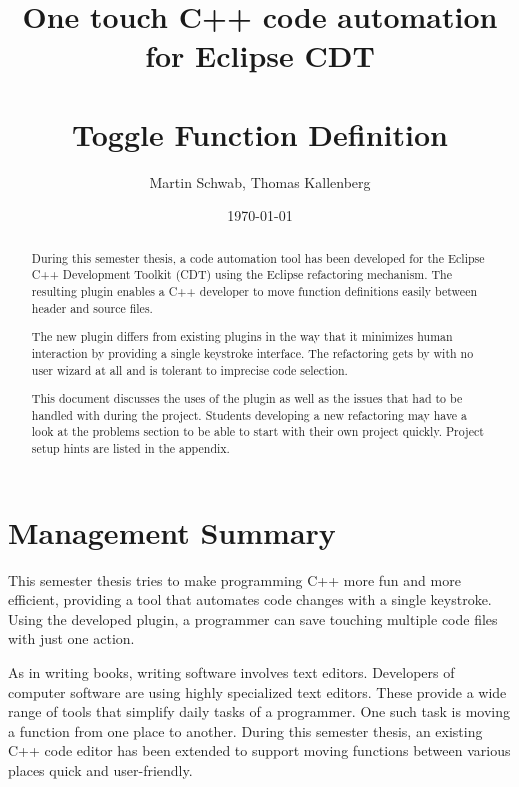 \documentclass[a4paper,12pt]{scrreprt}
\title{One touch C++ code automation for Eclipse CDT \\ ~ \\ 
\normalsize{Toggle Function Definition} }
\date{\today}
\author{Martin Schwab, Thomas Kallenberg}
\begin{document}
\maketitle
{}

\begin{abstract}
During this semester thesis, a code automation tool has been developed for the 
Eclipse C++ Development Toolkit (CDT) using the Eclipse refactoring mechanism. 
The resulting plugin enables a C++ developer to move function definitions easily 
between header and source files.

The new plugin differs from existing plugins in the way that it minimizes human 
interaction by providing a single keystroke interface. The refactoring gets by 
with no user wizard at all and is tolerant to imprecise code selection. 

This document discusses the uses of the plugin as well as the issues that had 
to be handled with during the project. Students developing a new refactoring may 
have a look at the problems section to be able to start with their own project 
quickly. Project setup hints are listed in the appendix.
\end{abstract}

\chapter*{Management Summary}
This semester thesis tries to make programming C++ more fun and more efficient, 
providing a tool that automates code changes with a single keystroke. Using the 
developed plugin, a programmer can save touching multiple code files with just 
one action.

As in writing books, writing software involves text editors. Developers of 
computer software are using highly specialized text editors. These provide a 
wide range of tools that simplify daily tasks of a programmer. One such task is 
moving a function from one place to another. During this semester thesis, an 
existing C++ code editor has been extended to support moving functions between 
various places quick and user-friendly.
\thispagestyle{empty}

\tableofcontents
\thispagestyle{empty}
\setcounter{page}{0}







\appendix

\thispagestyle{fancy}
\end{document}
